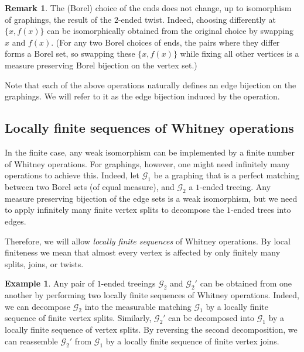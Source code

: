 \documentclass{article}
\theoremstyle{plain}
\theoremstyle{definition}
\newtheorem{ex}[thm]{Example}
\newtheorem{rem}[thm]{Remark}
\newcommand{\cG}{\mathcal{G}}
\begin{document}
\begin{rem}
    The (Borel) choice of the ends does not change, up to isomorphism of graphings, the result of the $2$-ended twist. Indeed, choosing differently at $\{x,f(x)\}$ can be isomorphically obtained from the original choice by swapping $x$ and $f(x)$. (For any two Borel choices of ends, the pairs where they differ forms a Borel set, so swapping these $\{x,f(x)\}$ while fixing all other vertices is a measure preserving Borel bijection on the vertex set.) 
\end{rem}


Note that each of the above operations naturally defines an edge bijection on the graphings. We will refer to it as the edge bijection induced by the operation.

\subsection{Locally finite sequences of Whitney operations} \label{subsec:infinitely_many_operations}


In the finite case, any weak isomorphism can be implemented by a finite number of Whitney operations. For graphings, however, one might need infinitely many operations to achieve this. Indeed, let $\cG_1$  be a graphing that is a perfect matching between two Borel sets (of equal measure), and $\cG_2$ a $1$-ended treeing. Any measure preserving bijection of the edge sets is a weak isomorphism, but we need to apply infinitely many finite vertex splits to decompose the $1$-ended trees into edges.

Therefore, we will allow \emph{locally finite sequences} of Whitney operations. By local finiteness we mean that almost every vertex is affected by only finitely many splits, joins, or twists. 



\begin{ex} \label{ex:1-ended_tree_transform}
    Any pair of $1$-ended treeings $\cG_2$ and $\cG_2'$ can be obtained from one another by performing two locally finite sequences of Whitney operations. Indeed, we can decompose $\cG_2$ into the measurable matching $\cG_1$ by a locally finite sequence of finite vertex splits. Similarly, $\cG_2'$ can be decomposed into $\cG_1$ by a locally finite sequence of vertex splits. By reversing the second decomposition, we can reassemble $\cG_2'$ from $\cG_1$ by a locally finite sequence of finite vertex joins. 
\end{ex}
\end{document}
